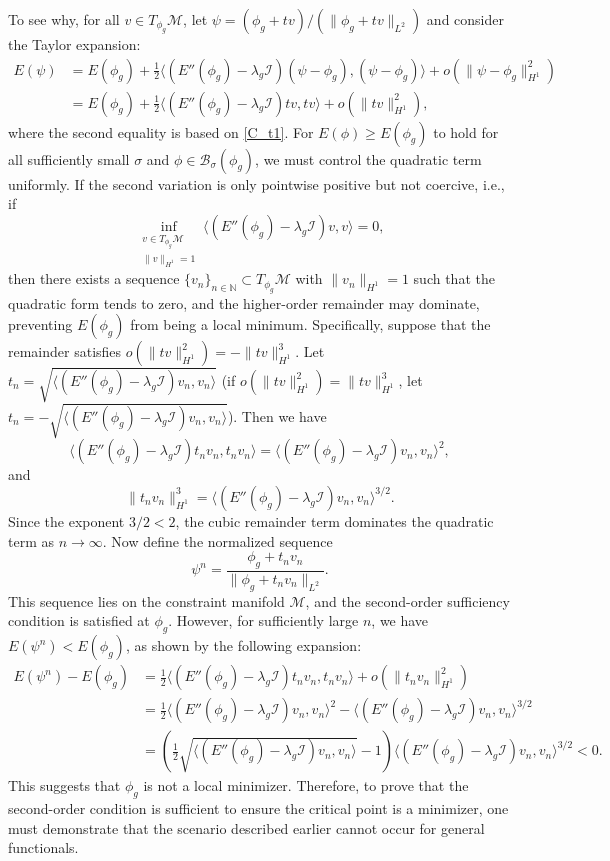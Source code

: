 \documentclass[preprint,3p]{elsarticle}
\begin{document}
To see why, for all $v\in T_{\phi_g}\mathcal{M}$, let $\psi = (\phi_g + t v)/(\|\phi_g + t v\|_{L^2})$ and consider the Taylor expansion:
\begin{align*}
	E(\psi) &= E(\phi_g) + \frac{1}{2}\langle (E''(\phi_g) - \lambda_g \mathcal{I}) (\psi-\phi_g), (\psi-\phi_g) \rangle + o(\|\psi-\phi_g\|_{H^1}^2)\\
	&=E(\phi_g) + \frac{1}{2}\langle (E''(\phi_g) - \lambda_g \mathcal{I}) tv, tv \rangle+ o(\|tv\|_{H^1}^2),
\end{align*}
where the second equality is based on \eqref{C_t1}.
For $E(\phi) \geq E(\phi_g)$ to hold for all sufficiently small $\sigma$ and $\phi\in\mathcal{B}_{\sigma}(\phi_g)$, we must control the quadratic term uniformly. If the second variation is only pointwise positive but not coercive, i.e., if
\[
\inf_{\substack{v \in T_{\phi_g}\mathcal{M} \\ \|v\|_{H^1} = 1}} \langle (E''(\phi_g) - \lambda_g \mathcal{I}) v, v \rangle = 0,
\]
then there exists a sequence $\{v_n\}_{n\in\mathbb{N}} \subset T_{\phi_g}\mathcal{M}$ with $\|v_n\|_{H^1} = 1$ such that the quadratic form tends to zero, and the higher-order remainder may dominate, preventing $E(\phi_g)$ from being a local minimum. Specifically, suppose that the remainder satisfies $o(\|tv\|^2_{H^1}) =-\|tv\|^3_{H^1}$. Let $t_n = \sqrt{\langle (E''(\phi_g) - \lambda_g \mathcal{I}) v_n, v_n \rangle}$ (if $o(\|tv\|^2_{H^1}) =\|tv\|^3_{H^1}$, let $t_n = -\sqrt{\langle (E''(\phi_g) - \lambda_g \mathcal{I}) v_n, v_n \rangle}$). Then we have
\[
\langle (E''(\phi_g) - \lambda_g \mathcal{I}) t_n v_n, t_n v_n \rangle = \langle (E''(\phi_g) - \lambda_g \mathcal{I}) v_n, v_n \rangle^2,
\]
and
\[
\|t_n v_n\|^3_{H^1} = \langle (E''(\phi_g) - \lambda_g \mathcal{I}) v_n, v_n \rangle^{3/2}.
\]
Since the exponent $3/2 < 2$, the cubic remainder term dominates the quadratic term as $n \to \infty$. Now define the normalized sequence
\[
\psi^n = \frac{\phi_g + t_n v_n}{\|\phi_g + t_n v_n\|_{L^2}}.
\]
This sequence lies on the constraint manifold $\mathcal{M}$, and the second-order sufficiency condition is satisfied at $\phi_g$. However, for sufficiently large $n$, we have $E(\psi^n) < E(\phi_g)$, as shown by the following expansion:
\begin{align*}
	E(\psi^n) - E(\phi_g)&=\frac{1}{2} \langle (E''(\phi_g) - \lambda_g \mathcal{I}) t_n v_n, t_n v_n \rangle + o(\|t_n v_n\|^2_{H^1})\\
	&=\frac{1}{2} \langle (E''(\phi_g) - \lambda_g \mathcal{I})v_n,v_n \rangle^2-\langle (E''(\phi_g) - \lambda_g \mathcal{I})v_n,v_n \rangle^{3/2}\\
	&=\left(\frac{1}{2}\sqrt{\langle (E''(\phi_g) - \lambda_g \mathcal{I})v_n,v_n \rangle}-1\right)\langle (E''(\phi_g) - \lambda_g \mathcal{I})v_n,v_n \rangle^{3/2}<0.
\end{align*}
This suggests that $\phi_g$ is not a local minimizer. Therefore, to prove that the second-order condition is sufficient to ensure the critical point is a minimizer, one must demonstrate that the scenario described earlier cannot occur for general functionals.
\end{document}
